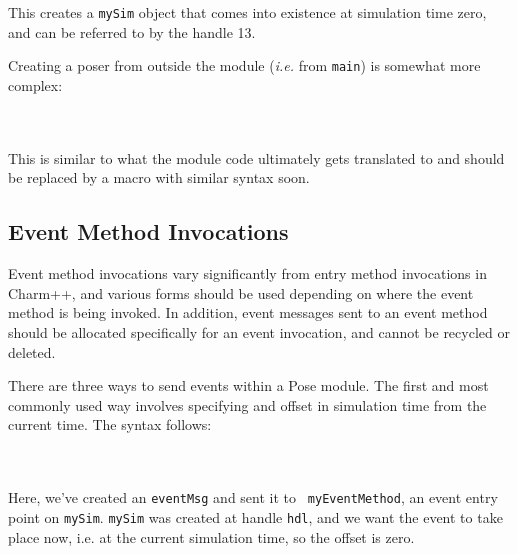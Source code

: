 \documentclass[10pt]{article}
\newcommand{\pose}{{\sc Pose}}
\begin{document}
~\\
\\

This creates a {\tt mySim} object that comes into existence at
simulation time zero, and can be referred to by the handle 13.  

Creating a poser from outside the module ({\it i.e.} from {\tt main})
is somewhat more complex:

~\\
\\

This is similar to what the module code ultimately gets translated to
and should be replaced by a macro with similar syntax soon.

\subsection{Event Method Invocations}

Event method invocations vary significantly from entry method
invocations in Charm++, and various forms should be used depending on
where the event method is being invoked.  In addition, event messages
sent to an event method should be allocated specifically for an event
invocation, and cannot be recycled or deleted.

There are three ways to send events within a \pose{} module.  The first
and most commonly used way involves specifying and offset in
simulation time from the current time.  The syntax follows:

~\\
\\

Here, we've created an {\tt eventMsg} and sent it to {\tt
myEventMethod}, an event entry point on {\tt mySim}.  {\tt mySim} was
created at handle {\tt hdl}, and we want the event to take place now,
i.e. at the current simulation time, so the offset is zero.  
\end{document}
